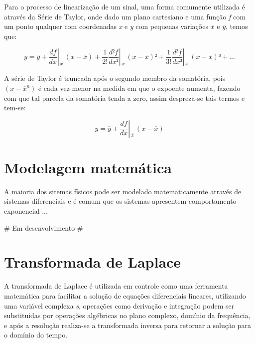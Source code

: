 Para o processo de linearização de um sinal, uma forma comumente utilizada é através da Série de Taylor, onde dado um plano cartesiano e uma função \emph{f} com um ponto qualquer com coordenadas \emph{x} e \emph{y} com pequenas variações $\overline{x}$ e $\overline{y}$, temos que:

\begin{center}
\begin{equation}
y = \overline{y} + 
\frac{df}{dx} \left| \frac{ }{ } _{\overline{x}} \right. \, (x - \overline{x}) + 
\frac{1}{2!} \frac{d²f}{dx²} \left| \frac{ }{ } _{\overline{x}} \right. \, (x - \overline{x})² +
\frac{1}{3!} \frac{d³f}{dx³} \left| \frac{ }{ } _{\overline{x}} \right. \, (x - \overline{x})³ + ...
\label{eqn:SerieTaylor}
\end{equation}
\end{center}



A série de Taylor é truncada após o segundo membro da somatória, pois $(x - \overline{x}^n )$ é cada vez menor na medida em que o expoente aumenta, fazendo com que tal parcela da somatória tenda a zero, assim despreza-se tais termos e tem-se:

\begin{center}
\begin{equation}
y = \overline{y} + 
\frac{df}{dx} \left| \frac{ }{ } _{\overline{x}} \right. \, (x - \overline{x})
\label{eqn:SerieTaylorTruncada}
\end{equation}
\end{center}


\section{Modelagem matemática}
A maioria dos sitemas físicos pode ser modelado matematicamente através de sistemas diferenciais e é comum que os sistemas apresentem comportamento exponencial ...

\# Em desenvolvimento \#


\section{Transformada de Laplace}
A transformada de Laplace é utilizada em controle como uma ferramenta matemática para facilitar a solução de equações diferenciais lineares, utilizando uma variável complexa \emph{s}, operações como derivação e integração podem ser substituidas por operações algébricas no plano complexo, domínio da frequência, e após a resolução realiza-se a transformada inversa para retornar a solução para o domínio do tempo.

